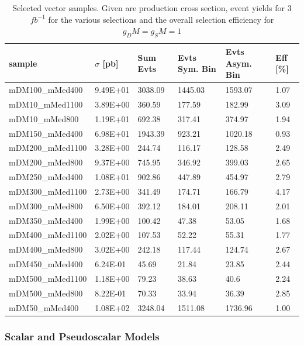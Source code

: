 \begin{table}[h]
\centering
\begin{tabular}{llllll}
\hline
sample             & $\sigma$ [pb] & Sum Evts       & Evts Sym. Bin & Evts Asym. Bin & Eff  [\%]   \\\hline
mDM100\_mMed400  & 9.49E+01 & 3038.09 & 1445.03 & 1593.07 & 1.07 \\
mDM10\_mMed1100  & 3.89E+00 & 360.59  & 177.59  & 182.99  & 3.09 \\
mDM10\_mMed800   & 1.19E+01 & 692.38  & 317.41  & 374.97  & 1.94 \\
mDM150\_mMed400  & 6.98E+01 & 1943.39 & 923.21  & 1020.18 & 0.93 \\
mDM200\_mMed1100 & 3.28E+00 & 244.74  & 116.17  & 128.58  & 2.49 \\
mDM200\_mMed800  & 9.37E+00 & 745.95  & 346.92  & 399.03  & 2.65 \\
mDM250\_mMed400  & 1.08E+01 & 902.86  & 447.89  & 454.97  & 2.79 \\
mDM300\_mMed1100 & 2.73E+00 & 341.49  & 174.71  & 166.79  & 4.17 \\
mDM300\_mMed800  & 6.50E+00 & 392.12  & 184.01  & 208.11  & 2.01 \\
mDM350\_mMed400  & 1.99E+00 & 100.42  & 47.38   & 53.05   & 1.68 \\
mDM400\_mMed1100 & 2.02E+00 & 107.53  & 52.22   & 55.31   & 1.77 \\
mDM400\_mMed800  & 3.02E+00 & 242.18  & 117.44  & 124.74  & 2.67 \\
mDM450\_mMed400  & 6.24E-01 & 45.69   & 21.84   & 23.85   & 2.44 \\
mDM500\_mMed1100 & 1.18E+00 & 79.23   & 38.63   & 40.6    & 2.24 \\
mDM500\_mMed800  & 8.22E-01 & 70.33   & 33.94   & 36.39   & 2.85 \\
mDM50\_mMed400   & 1.08E+02 & 3248.04 & 1511.08 & 1736.96 & 1.00 \\
\hline
\end{tabular}
\caption{Selected vector samples. Given are production cross section, event yields for 3 $fb^{-1 }$ for the various selections and the overall selection efficiency for $g_DM=g_SM=1$}
\label{tab:dm_V_g1_3fb}
\end{table}

\subsubsection{Scalar and Pseudoscalar Models} \label{sec:dm_pscalar}

